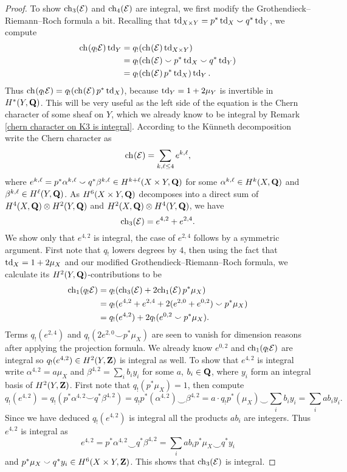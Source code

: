 \begin{proof}
    To show $\ch[3]{\E}$ and $\ch[4]{\E}$ are integral, we first modify the Grothendieck--Riemann--Roch formula a bit. Recalling that $\operatorname{td}_{X \times Y} = p^*\operatorname{td}_{X} \smallsmile q^*\operatorname{td}_{Y}$, we compute
    \begin{align*}
        \ch[]{q_!\E}\tdclass{Y} &= q_!(\ch[]{\E}\tdclass{X \times Y}) \\
        &= q_!(\ch[]{\E} \smallsmile p^*\tdclass{X} \smallsmile q^*\tdclass{Y}) \\
        &= q_!(\ch[]{\E}p^*\tdclass{X})\tdclass{Y}.  
    \end{align*} 
    Thus $\ch[]{q_!\E} = q_!(\ch[]{\E}p^*\tdclass{X})$, because $\operatorname{td}_{Y} = 1 + 2\mu_Y$ is invertible in $H^{*}(Y, \mathbf Q)$. This will be very useful as the left side of the equation is the Chern character of some sheaf on $Y$, which we already know to be integral by Remark \ref{chern character on K3 is integral}. According to the Künneth decomposition write the Chern character as 
    \[
        \ch[]{\E} = \sum_{k,\ell \leq 4} e^{k,\ell},
    \]
    where $e^{k,\ell} = p^* \alpha^{k,\ell} \smallsmile q^*\beta^{k, \ell} \in H^{k+\ell}(X \times Y, \mathbf Q)$ for some $\alpha^{k,\ell} \in H^{k}(X, \mathbf Q)$ and $\beta^{k, \ell} \in H^{\ell}(Y, \mathbf Q)$. As $H^{6}(X \times Y, \mathbf Q)$ decomposes into a direct sum of $H^4(X, \mathbf Q) \otimes H^2(Y, \mathbf Q)$ and $H^2(X, \mathbf Q) \otimes H^4(Y, \mathbf Q)$, we have
    \[
        \ch[3]{\E} = e^{4,2} + e^{2,4}.
    \]
    We show only that $e^{4,2}$ is integral, the case of $e^{2,4}$ follows by a symmetric argument. First note that $q_!$ lowers degrees by $4$, then using the fact that $\operatorname{td}_{X} = 1 + 2\mu_X$ and our modified Grothendieck--Riemann--Roch formula, we calculate its $H^2(Y, \mathbf Q)$-contributions to be
    \begin{align*}
        \ch[1]{q_!\E} &= q_!(\ch[3]{\E} + 2\ch[1]{\E}p^*\mu_X) \\
        &= q_!(e^{4,2} + e^{2,4} + 2(e^{2,0} + e^{0,2}) \smallsmile p^*\mu_X) \\
        &= q_!(e^{4,2}) + 2q_!(e^{0,2} \smallsmile p^*\mu_X).
    \end{align*}
    Terms $ q_!(e^{2,4})$ and $q_!(2e^{2,0} \smallsmile p^*\mu_X)$ are seen to vanish for dimension reasons after applying the projection formula. We already know $e^{0,2}$ and $\ch[1]{q_!\E}$ are integral so $q_!(e^{4,2}) \in H^{2}(Y, \mathbf Z)$ is integral as well. To show that $e^{4,2}$ is integral write $\alpha^{4,2} = a \mu_X$ and $\beta^{4,2} = \sum_i b_i y_i$ for some $a$, $b_i \in \mathbf Q$, where $y_i$ form an integral basis of $H^{2}(Y, \mathbf Z)$. First note that $q_!(p^*\mu_X) = 1$, then compute
    \[
        q_!(e^{4,2}) = q_!(p^*\alpha^{4,2} \smallsmile q^*\beta^{4,2}) = q_!p^*(\alpha^{4,2}) \smallsmile \beta^{4,2} = a \cdot q_!p^*(\mu_X) \smallsmile \sum_i b_i y_i = \sum_i ab_i y_i.
    \]
    Since we have deduced $q_!(e^{4,2})$ is integral all the products $ab_i$ are integers. Thus $e^{4,2}$ is integral as
    \[
        e^{4,2} = p^*\alpha^{4,2} \smallsmile q^*\beta^{4,2} = \sum_i ab_i p^*\mu_X \smallsmile q^*y_i
    \]
    and $p^*\mu_X \smallsmile q^*y_i \in H^{6}(X \times Y, \mathbf Z)$. This shows that $\ch[3]{\E}$ is integral.


\end{proof}
